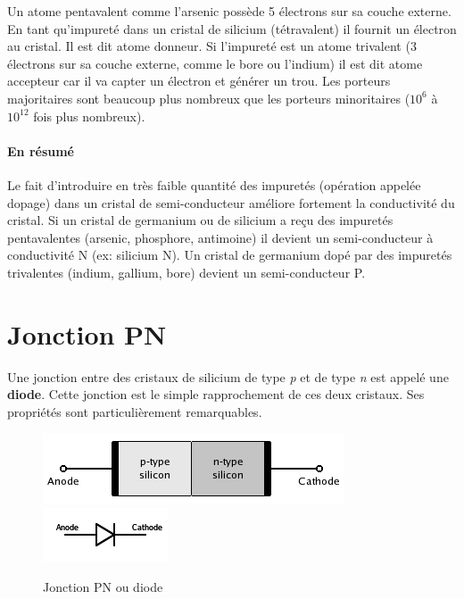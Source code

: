 Un atome pentavalent comme l'arsenic possède 5 électrons sur sa couche externe. En tant qu'impureté dans un cristal de silicium
(tétravalent) il fournit un électron au cristal. Il est dit atome donneur.
Si l'impureté est un atome trivalent (3 électrons sur sa couche externe, comme le bore ou l'indium) il est dit atome accepteur car il va
capter un électron et générer un trou. Les porteurs majoritaires sont beaucoup plus nombreux que les porteurs minoritaires ($10^6$ à $10^{12}$ fois
plus nombreux).\\

\paragraph{En résumé} Le fait d'introduire en très faible quantité des impuretés (opération appelée dopage) dans un cristal de semi-conducteur améliore
fortement la conductivité du cristal. Si un cristal de germanium ou de silicium a reçu des impuretés pentavalentes (arsenic, phosphore,
antimoine) il devient un semi-conducteur à conductivité N (ex: silicium N).
Un cristal de germanium dopé par des impuretés trivalentes (indium, gallium, bore) devient un semi-conducteur P.

\section{Jonction PN}
Une jonction entre des cristaux de silicium de type {\it p} et de type {\it n} est appelé une {\bf diode}. Cette jonction est le simple rapprochement
de ces deux cristaux. Ses propriétés sont particulièrement remarquables.\\

\begin{figure}[htb]
  \begin{center}
    \includegraphics[scale=0.6]{figures/PN_Junction_Open_Circuited.png}
    \includegraphics[scale=0.8]{figures/Diode_symbol.png}
    \caption{Jonction PN ou diode}
  \end{center}
\end{figure}

